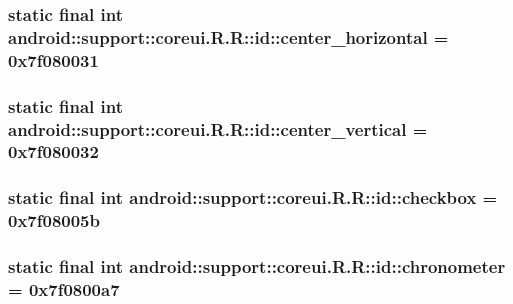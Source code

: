 \hypertarget{classandroid_1_1support_1_1coreui_1_1_r_1_1id_094c423f695ad4689b893562d803b34d}{
\subsubsection[{center\_\-horizontal}]{\setlength{\rightskip}{0pt plus 5cm}static final int android::support::coreui.R.R::id::center\_\-horizontal = 0x7f080031}}
\label{classandroid_1_1support_1_1coreui_1_1_r_1_1id_094c423f695ad4689b893562d803b34d}


\hypertarget{classandroid_1_1support_1_1coreui_1_1_r_1_1id_6a5bfdf4cfc7b5d076342628fd3edad3}{
\subsubsection[{center\_\-vertical}]{\setlength{\rightskip}{0pt plus 5cm}static final int android::support::coreui.R.R::id::center\_\-vertical = 0x7f080032}}
\label{classandroid_1_1support_1_1coreui_1_1_r_1_1id_6a5bfdf4cfc7b5d076342628fd3edad3}


\hypertarget{classandroid_1_1support_1_1coreui_1_1_r_1_1id_0d88fd6a32e189bbd7c50320c1efea52}{
\subsubsection[{checkbox}]{\setlength{\rightskip}{0pt plus 5cm}static final int android::support::coreui.R.R::id::checkbox = 0x7f08005b}}
\label{classandroid_1_1support_1_1coreui_1_1_r_1_1id_0d88fd6a32e189bbd7c50320c1efea52}


\hypertarget{classandroid_1_1support_1_1coreui_1_1_r_1_1id_97c1e3dd6f6812363fe8531c6fb6cf38}{
\subsubsection[{chronometer}]{\setlength{\rightskip}{0pt plus 5cm}static final int android::support::coreui.R.R::id::chronometer = 0x7f0800a7}}
\label{classandroid_1_1support_1_1coreui_1_1_r_1_1id_97c1e3dd6f6812363fe8531c6fb6cf38}


